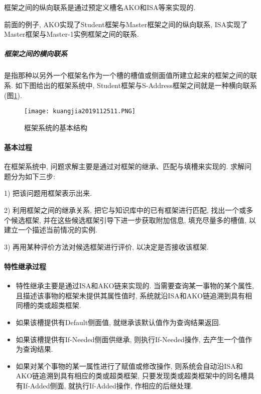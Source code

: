 框架之间的纵向联系是通过预定义槽名AKO和ISA等来实现的.
\begin{example}
    前面的例子, AKO实现了Student框架与Master框架之间的纵向联系, ISA实现了Master框架与Master-1实例框架之间的联系.
\end{example}
\subparagraph{框架之间的横向联系}
    是指那种以另外一个框架名作为一个槽的槽值或侧面值所建立起来的框架之间的联系. 如下图给出的框架系统中, Student框架与S-Address框架之间就是一种横向联系(图\ref{AI32fig11}).
\begin{figure}[H]
    \centering
    \texttt{[image: kuangjia2019112511.PNG]}
    \caption{框架系统的基本结构}
    \label{AI32fig11}
\end{figure}
\paragraph{基本过程}
    在框架系统中, 问题求解主要是通过对框架的继承、匹配与填槽来实现的. 求解问题分为如下三步:

1) 把该问题用框架表示出来.

2) 利用框架之间的继承关系, 把它与知识库中的已有框架进行匹配, 找出一个或多个候选框架, 并在这些候选框架引导下进一步获取附加信息, 填充尽量多的槽值, 以建立一个描述当前情况的实例.

3) 再用某种评价方法对候选框架进行评价, 以决定是否接收该框架.
\paragraph{特性继承过程}
\begin{itemize}
    \item  特性继承主要是通过ISA和AKO链来实现的. 当需要查询某一事物的某个属性, 且描述该事物的框架未提供其属性值时, 系统就沿ISA和AKO链追溯到具有相同槽的类或超类框架.
    \item  如果该槽提供有Default侧面值, 就继承该默认值作为查询结果返回.
    \item  如果该槽提供有If-Needed侧面供继承, 则执行If-Needed操作, 去产生一个值作为查询结果.
    \item  如果对某个事物的某一属性进行了赋值或修改操作, 则系统会自动沿ISA和AKO链追溯到具有相应的类或超类框架, 只要发现类或超类框架中的同名槽具有If-Added侧面, 就执行If-Added操作, 作相应的后继处理.
\end{itemize}
